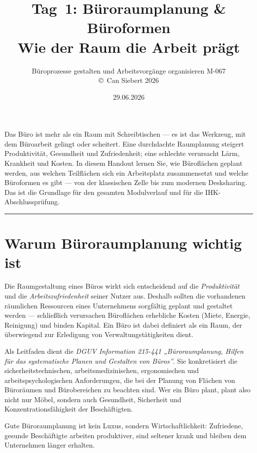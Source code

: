 \documentclass[11pt, a4paper]{article}
\title{\vspace*{-1.5cm}\Huge\bfseries\color{bfwPrimaryDark}Tag~1: Büroraumplanung \& Büroformen\\[0.4em]
  \large\color{bfwInkSoft}\textnormal{Wie der Raum die Arbeit prägt}}
\author{\textsf{Büroprozesse gestalten und Arbeitsvorgänge organisieren \textperiodcentered{} M-067}\\
\textsf{\small\copyright\ Can Siebert\,\textperiodcentered\,2026}}
\date{29.06.2026}
\begin{document}
\maketitle
\thispagestyle{empty}

\vspace{1em}
\begin{merksatz}[title={\bfseries Worum geht es heute?}]
Das Büro ist mehr als ein Raum mit Schreibtischen --- es ist das Werkzeug, mit dem
Büroarbeit gelingt oder scheitert. Eine durchdachte Raumplanung steigert Produktivität,
Gesundheit und Zufriedenheit; eine schlechte verursacht Lärm, Krankheit und Kosten.
In diesem Handout lernen Sie, wie Büroflächen geplant werden, aus welchen Teilflächen
sich ein Arbeitsplatz zusammensetzt und welche Büroformen es gibt --- von der klassischen
Zelle bis zum modernen Desksharing. Das ist die Grundlage für den gesamten
Modulverlauf und für die IHK-Abschlussprüfung.
\end{merksatz}

\tableofcontents
\vspace{1em}
\hrule
\vspace{1em}

\section{Warum Büroraumplanung wichtig ist}

Die Raumgestaltung eines Büros wirkt sich entscheidend auf die \emph{Produktivität}
und die \emph{Arbeitszufriedenheit} seiner Nutzer aus. Deshalb sollten die vorhandenen
räumlichen Ressourcen eines Unternehmens sorgfältig geplant und gestaltet werden ---
schließlich verursachen Büroflächen erhebliche Kosten (Miete, Energie, Reinigung) und
binden Kapital. Ein Büro ist dabei definiert als ein Raum, der überwiegend zur
Erledigung von Verwaltungstätigkeiten dient.

Als Leitfaden dient die \emph{DGUV Information 215-441 „Büroraumplanung, Hilfen für das
systematische Planen und Gestalten von Büros”}. Sie konkretisiert die sicherheits\-tech\-nischen,
arbeitsmedizinischen, ergonomischen und arbeitspsychologischen Anforderungen, die bei
der Planung von Flächen von Büroräumen und Bürobereichen zu beachten sind. Wer ein Büro
plant, plant also nicht nur Möbel, sondern auch Gesundheit, Sicherheit und
Konzentrationsfähigkeit der Beschäftigten.

\begin{merksatz}
Gute Büroraumplanung ist kein Luxus, sondern Wirtschaftlichkeit: Zufriedene, gesunde
Beschäftigte arbeiten produktiver, sind seltener krank und bleiben dem Unternehmen
länger erhalten.
\end{merksatz}
\end{document}
